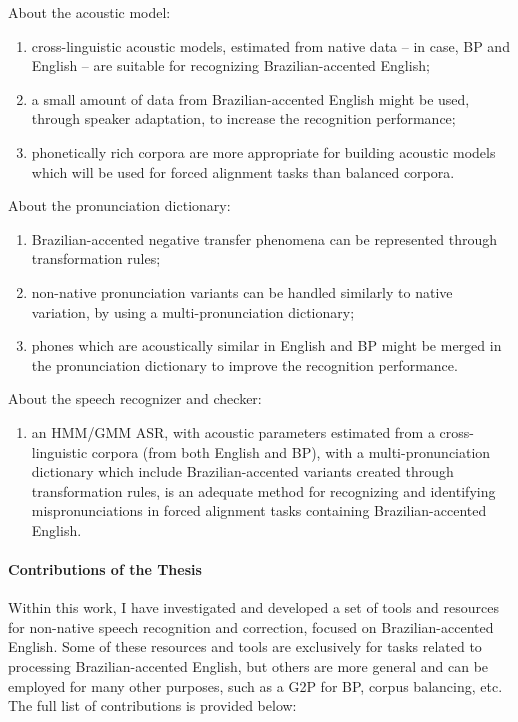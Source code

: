 About the acoustic model:
\begin{enumerate}
 \item cross-linguistic acoustic models, estimated from native data -- in case, \ac{BP} and English -- are suitable for recognizing Brazilian-accented English;
 \item a small amount of data from Brazilian-accented English might be used, through speaker adaptation, to increase the recognition performance;
 \item phonetically rich corpora are more appropriate for building acoustic models which will be used for forced alignment tasks than balanced corpora.
\end{enumerate}
About the pronunciation dictionary:
\begin{enumerate}
 \item Brazilian-accented negative transfer phenomena can be represented through transformation rules;
 \item non-native pronunciation variants can be handled similarly to native variation, by using a  multi-pronunciation dictionary;
 \item phones which are acoustically similar in English and \ac{BP} might be merged in the pronunciation dictionary to improve the recognition performance.
\end{enumerate}
About the speech recognizer and checker:
\begin{enumerate}
 \item an HMM/GMM \ac{ASR}, with acoustic parameters estimated from a cross-linguistic corpora (from both English and \ac{BP}), with a multi-pronunciation dictionary which include Brazilian-accented variants created through transformation rules, is an adequate method for recognizing and identifying mispronunciations in forced alignment tasks containing Brazilian-accented English.
\end{enumerate}

\paragraph{Contributions of the Thesis}

Within this work, I have investigated and developed a set of tools and resources for non-native speech recognition and correction, focused on Brazilian-accented English. Some of these resources and tools are exclusively for tasks related to processing Brazilian-accented English, but others are more general and can be employed for many other purposes, such as a \ac{G2P} for \ac{BP}, corpus balancing, etc. The full list of contributions is provided below:

